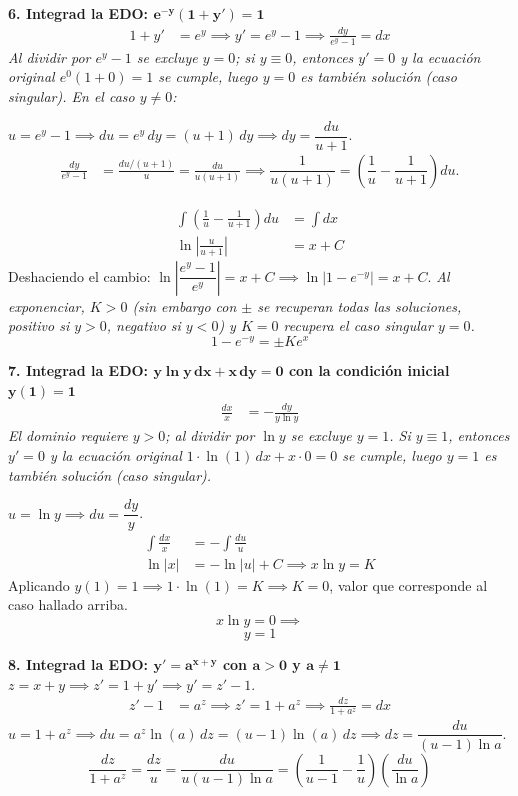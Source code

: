 \documentclass[11pt, a4paper]{article}
\begin{document}
\noindent\textbf{6. Integrad la EDO: $\bm{e^{-y}(1+y')=1}$} \\
\begin{align*}
1+y' &= e^y \implies y' = e^y - 1 \implies \frac{dy}{e^y-1} = dx
\end{align*}
\textit{Al dividir por $e^y-1$ se excluye $y=0$; si $y\equiv0$, entonces $y'=0$ y la ecuación original $e^{0}(1+0)=1$ se cumple, luego $y=0$ es también solución (caso singular). En el caso $y\neq0$:}

$u=e^y-1 \implies du=e^y\,dy=(u+1)\,dy \implies dy=\dfrac{du}{u+1}$.
\begin{align*}
\frac{dy}{e^y-1} &= \frac{du/(u+1)}{u} = \frac{du}{u(u+1)} \implies \dfrac{1}{u(u+1)}=( \dfrac{1}{u}-\dfrac{1}{u+1} ){du}.
\end{align*}

\begin{align*}
\int \left(\frac{1}{u}-\frac{1}{u+1}\right)du &= \int dx \\
\ln\left|\frac{u}{u+1}\right| &= x+C
\end{align*}
Deshaciendo el cambio: $\ln\left|\dfrac{e^y-1}{e^y}\right|=x+C \implies \ln|1-e^{-y}|=x+C$.
\textit{Al exponenciar, $K>0$ (sin embargo con $\pm$ se recuperan todas las soluciones, positivo si $y>0$, negativo si $y<0$) y $K=0$ recupera el caso singular $y=0$.}
\[
\boxed{1 - e^{-y} = \pm K e^x}
\]


\noindent\textbf{7. Integrad la EDO: $\bm{y\ln y \, dx + x \, dy = 0}$ con la condición inicial $\bm{y(1)=1}$} \\
\begin{align*}
\frac{dx}{x} &= -\frac{dy}{y\ln y}
\end{align*}
\textit{El dominio requiere $y>0$; al dividir por $\ln y$ se excluye $y=1$. Si $y\equiv1$, entonces $y'=0$ y la ecuación original $1\cdot\ln(1)\,dx+x\cdot0=0$ se cumple, luego $y=1$ es también solución (caso singular).}

$u = \ln y \implies du = \dfrac{dy}{y}$.
\begin{align*}
\int \frac{dx}{x} &= -\int \frac{du}{u} \\
\ln|x| &= -\ln|u| + C \implies x\ln y = K
\end{align*}
Aplicando $y(1)=1 \implies 1 \cdot \ln(1) = K \implies K = 0$, valor que corresponde al caso hallado arriba.
\[
x\ln y = 0 \implies
\]
\[
\boxed{y = 1}
\]


\noindent\textbf{8. Integrad la EDO: $\bm{y' = a^{x+y}}$ con $\bm{a>0}$ y $\bm{a \neq 1}$} \\
$z = x+y \implies z' = 1+y' \implies y' = z'-1$.
\begin{align*}
z'-1 &= a^z \implies z' = 1+a^z \implies \frac{dz}{1+a^z} = dx
\end{align*}
$u = 1+a^z \implies du = a^z\ln(a)\,dz = (u-1)\ln(a)\,dz \implies dz = \dfrac{du}{(u-1)\ln a}$.
\[
\frac{dz}{1+a^z} = \frac{dz}{u} = \frac{du}{u(u-1)\ln a} = (\dfrac{1}{u-1}-\dfrac{1}{u})(\frac{du}{\ln a})
\]
\end{document}
